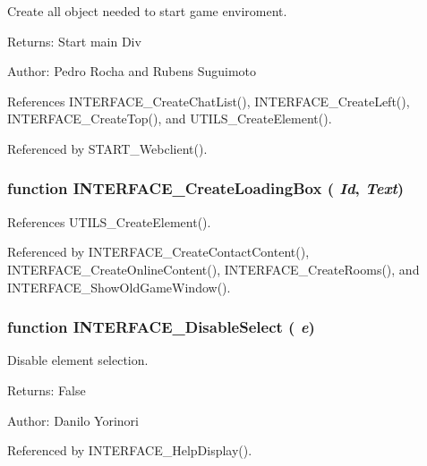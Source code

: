 Create all object needed to start game enviroment. 

\begin{Desc}
\item[Returns:]Start main Div \end{Desc}
\begin{Desc}
\item[Author:]Pedro Rocha and Rubens Suguimoto \end{Desc}


References INTERFACE\_\-CreateChatList(), INTERFACE\_\-CreateLeft(), INTERFACE\_\-CreateTop(), and UTILS\_\-CreateElement().

Referenced by START\_\-Webclient().
\subsubsection[INTERFACE\_\-CreateLoadingBox]{\setlength{\rightskip}{0pt plus 5cm}function INTERFACE\_\-CreateLoadingBox ( {\em Id}, \/   {\em Text})}\label{interface_8js_a2b8a7be1b4f4e21bd3362812922522b}




References UTILS\_\-CreateElement().

Referenced by INTERFACE\_\-CreateContactContent(), INTERFACE\_\-CreateOnlineContent(), INTERFACE\_\-CreateRooms(), and INTERFACE\_\-ShowOldGameWindow().
\subsubsection[INTERFACE\_\-DisableSelect]{\setlength{\rightskip}{0pt plus 5cm}function INTERFACE\_\-DisableSelect ( {\em e})}\label{interface_8js_309034c5965ab2448ad1934cac080c18}


Disable element selection. 

\begin{Desc}
\item[Returns:]False \end{Desc}
\begin{Desc}
\item[Author:]Danilo Yorinori \end{Desc}


Referenced by INTERFACE\_\-HelpDisplay().
